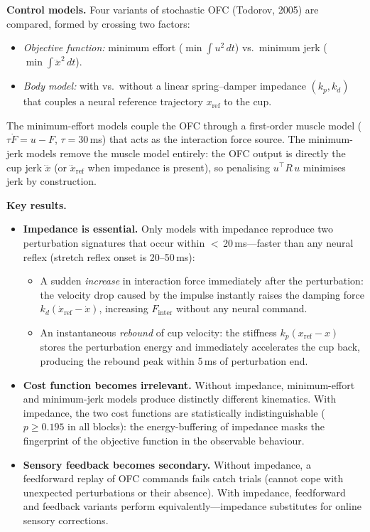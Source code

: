 \documentclass[11pt]{article}
\begin{document}
\textbf{Control models.}  Four variants of stochastic OFC (Todorov, 2005) are compared, formed by crossing two factors:
\begin{itemize}[leftmargin=1.2em]
  \item \emph{Objective function:} minimum effort ($\min \int u^2\,dt$) vs.\ minimum jerk ($\min \int \dddot{x}^2\,dt$).
  \item \emph{Body model:} with vs.\ without a linear spring--damper impedance $(k_p, k_d)$ that couples a neural reference trajectory $x_{\text{ref}}$ to the cup.
\end{itemize}
The minimum-effort models couple the OFC through a first-order muscle model ($\tau\dot{F}=u-F$, $\tau=30$\,ms) that acts as the interaction force source.  The minimum-jerk models remove the muscle model entirely: the OFC output is directly the cup jerk $\dddot{x}$ (or $\dddot{x}_{\text{ref}}$ when impedance is present), so penalising $u^\top R\,u$ minimises jerk by construction.

\textbf{Key results.}
\begin{itemize}[leftmargin=1.2em]
  \item \textbf{Impedance is essential.}  Only models with impedance reproduce two perturbation signatures that occur within ${<}$\,20\,ms---faster than any neural reflex (stretch reflex onset is 20--50\,ms):
    \begin{itemize}
      \item A sudden \emph{increase} in interaction force immediately after the perturbation: the velocity drop caused by the impulse instantly raises the damping force $k_d(\dot{x}_{\text{ref}}-\dot{x})$, increasing $F_{\text{inter}}$ without any neural command.
      \item An instantaneous \emph{rebound} of cup velocity: the stiffness $k_p(x_{\text{ref}}-x)$ stores the perturbation energy and immediately accelerates the cup back, producing the rebound peak within 5\,ms of perturbation end.
    \end{itemize}
  \item \textbf{Cost function becomes irrelevant.}  Without impedance, minimum-effort and minimum-jerk models produce distinctly different kinematics.  With impedance, the two cost functions are statistically indistinguishable ($p \geq 0.195$ in all blocks): the energy-buffering of impedance masks the fingerprint of the objective function in the observable behaviour.
  \item \textbf{Sensory feedback becomes secondary.}  Without impedance, a feedforward replay of OFC commands fails catch trials (cannot cope with unexpected perturbations or their absence).  With impedance, feedforward and feedback variants perform equivalently---impedance substitutes for online sensory corrections.
\end{itemize}
\end{document}
